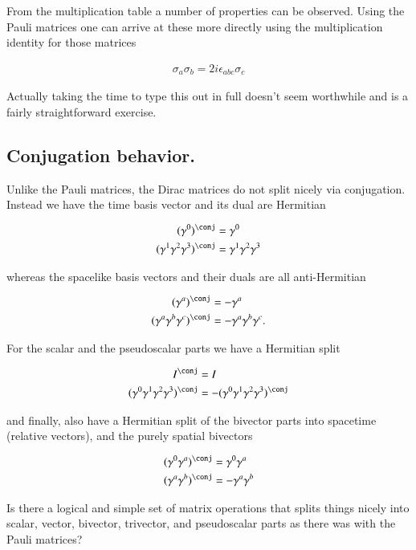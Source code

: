 From the multiplication table a number of properties can be observed.  Using the Pauli matrices one can arrive at these more directly using the multiplication identity for those
matrices

\begin{align}
\sigma_a \sigma_b = 2 i \epsilon_{abc} \sigma_c
\end{align}

Actually taking the time to type this out in full doesn't seem worthwhile and is a fairly straightforward exercise.

\subsection{Conjugation behavior. }

Unlike the Pauli matrices, the Dirac matrices do not split nicely via conjugation.  Instead we have the time basis vector and its dual are Hermitian

\begin{align*}
(\gamma^0)^\conj &= \gamma^0 \\
(\gamma^1 \gamma^2 \gamma^3)^\conj &= \gamma^1 \gamma^2 \gamma^3
\end{align*}

whereas the spacelike basis vectors and their duals are all anti-Hermitian

\begin{align*}
(\gamma^a)^\conj &= -\gamma^a \\
(\gamma^a \gamma^b \gamma^c)^\conj &= - \gamma^a \gamma^b \gamma^c.
\end{align*}

For the scalar and the pseudoscalar parts we have a Hermitian split

\begin{align*}
I^\conj &= I \\
(\gamma^0 \gamma^1 \gamma^2 \gamma^3)^\conj &= -(\gamma^0 \gamma^1 \gamma^2 \gamma^3)^\conj
\end{align*}

and finally, also have a Hermitian split of the bivector parts into spacetime (relative vectors), and the purely spatial bivectors

\begin{align*}
(\gamma^0 \gamma^a)^\conj &= \gamma^0 \gamma^a \\
(\gamma^a \gamma^b)^\conj &= -\gamma^a \gamma^b
\end{align*}

Is there a logical and simple set of matrix operations that splits things nicely into scalar, vector, bivector, trivector, and pseudoscalar parts as there was with the Pauli
matrices?

